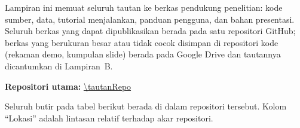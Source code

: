 \vspace{1.5ex}

\noindent
Lampiran ini memuat seluruh tautan ke berkas pendukung penelitian: kode sumber,
data, tutorial menjalankan, panduan pengguna, dan bahan presentasi. Seluruh
berkas yang dapat dipublikasikan berada pada satu repositori GitHub; berkas
yang berukuran besar atau tidak cocok disimpan di repositori kode (rekaman
demo, kumpulan slide) berada pada Google Drive dan tautannya dicantumkan di
Lampiran~B.


\noindent
\textbf{Repositori utama:} \url{\tautanRepo}

\vspace{1ex}
\noindent
Seluruh butir pada tabel berikut berada di dalam repositori tersebut. Kolom
``Lokasi'' adalah lintasan relatif terhadap akar repositori.


